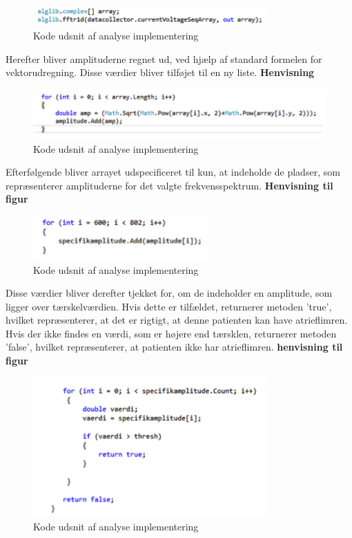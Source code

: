 \begin{figure}[H]
	\centering
	\includegraphics[width=0.8\textwidth]{Figurer/Snip20150525_41}
	\caption{Kode udsnit af analyse implementering}
\end{figure}

Herefter bliver amplituderne regnet ud, ved hjælp af standard formelen for vektorudregning. Disse værdier bliver tilføjet til en ny liste. \textbf{Henvisning}

\begin{figure}[H]
	\centering
	\includegraphics[width=1\textwidth]{Figurer/Snip20150525_43}
	\caption{Kode udsnit af analyse implementering}
\end{figure}

Efterfølgende bliver arrayet udspecificeret til kun, at indeholde de pladser, som repræsenterer amplituderne for det valgte frekvensspektrum. \textbf{Henvisning til figur} 

\begin{figure}[H]
	\centering
	\includegraphics[width=0.6\textwidth]{Figurer/Snip20150525_44}
	\caption{Kode udsnit af analyse implementering}
\end{figure}

Disse værdier bliver derefter tjekket for, om de indeholder en amplitude, som ligger over tærskelværdien. Hvis dette er tilfældet, returnerer metoden ’true’, hvilket repræsenterer, at det er rigtigt, at denne patienten kan have atrieflimren. Hvis der ikke findes en værdi, som er højere end tærsklen, returnerer metoden ’false’, hvilket repræsenterer, at patienten ikke har atrieflimren. \textbf{henvisning til figur} 

\begin{figure}[H]
	\centering
	\includegraphics[width=0.8\textwidth]{Figurer/Snip20150525_47}
	\caption{Kode udsnit af analyse implementering}
\end{figure}

